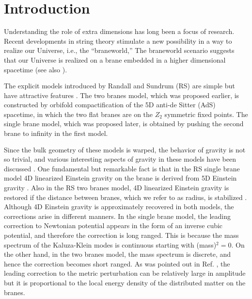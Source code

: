 \documentclass[a4paper,showpacs,preprintnumbers,amsmath,amssymb]{revtex4}
\begin{document}
  


\section{Introduction}



Understanding the role of extra dimensions has long been a focus of
research. Recent developments in string theory stimulate a
new possibility in a way to realize our Universe, i.e., the ``braneworld,''
The braneworld scenario suggests that our Universe is realized on 
a brane embedded in a higher dimensional spacetime 
\cite{Arkani-Hamed:1998rs,Randall:1999ee,Randall:1999vf}
(see also \cite{Rubakov:1983bb,Visser:1985qm,Akama:1987ig}).



The explicit models introduced by Randall and Sundrum (RS) are 
simple but have attractive features \cite{Randall:1999ee,Randall:1999vf}. 
The two branes model, which was proposed earlier, 
is constructed by orbifold compactification of the 5D anti-de Sitter (AdS) spacetime, in which the two flat branes are on the $Z_2$ symmetric fixed points. The single brane model, which was proposed later, is obtained by pushing the second brane to infinity in the first model.  


Since the bulk geometry of these models is warped, the behavior of gravity is not so trivial, and various interesting aspects of gravity in these models have been discussed \cite{Lykken:2000nb,Mukohyama:2001wq,Garriga:2000yh,Tanaka:2000er,Shiromizu:2000wj,Giddings:2000mu,Tanaka:2000zv,Mukohyama:2001ks,Mukohyama:2001jv}.  
One fundamental but remarkable fact is that in the RS single brane model
4D linearized Einstein gravity on the brane is derived from 5D Einstein gravity \cite{Randall:1999vf,Garriga:2000yh,Giddings:2000mu}. 
Also in the RS two branes model,  4D linearized Einstein gravity is restored  \cite{Tanaka:2000er,Mukohyama:2001ks} if 
the distance between branes, which we refer to as radius, is stabilized 
\cite{Goldberger:1999uk,Goldberger:2000un,DeWolfe:2000cp,Goldberger:2000dv,Arkani-Hamed:2001kx,Luty:2001ec,Hofmann:2001cj,Garriga:2001jb,Garriga:2001ar,Flachi:2001bj,Csaki:2000mp,Nojiri:2000bz,Nojiri:2000eb}.  
Although 4D Einstein gravity is approximately recovered
in both models, the corrections arise in different manners. 
In the single brane model, the leading correction to 
Newtonian potential appears in the form of an inverse cubic potential, and therefore the correction is long ranged.  This is because the mass spectrum of the Kaluza-Klein modes is continuous starting with (mass)$^2=0$.  
On the other hand, in the two branes model, the mass spectrum is discrete, and hence the correction becomes short ranged. As was pointed out in Ref. \cite{Tanaka:2000zv}, the leading correction to the metric perturbation can be relatively large in amplitude but it is proportional to the local energy density of the distributed matter on the branes. 
\end{document}
